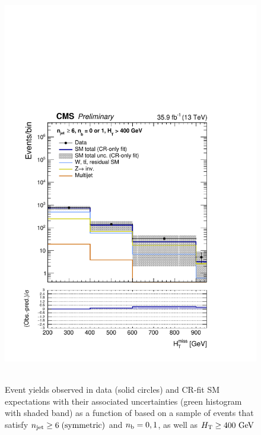 \clearpage
\begin{figure}[h!]
  \centering
  \caption{Event yields observed in data (solid circles) and CR-fit SM expectations with their associated uncertainties 
  (green histogram with shaded band) as a function of \HTmiss based on a sample of events that satisfy 
  $n_{\text{jet}} \geq 6 \; \textrm{(symmetric)}$ and $n_{\text{b}} = 0, 1$, as well as $\mbox{$H_\text{T}$} \geq 400 \textrm{ GeV}$ }
  \includegraphics[width=0.8\linewidth]{figures/results/36invfb_preapproval/aggregated/postFitShapeCR/mhtShape_eq01b_ge6j_400_Inf_crfit.pdf} ~
\end{figure}

